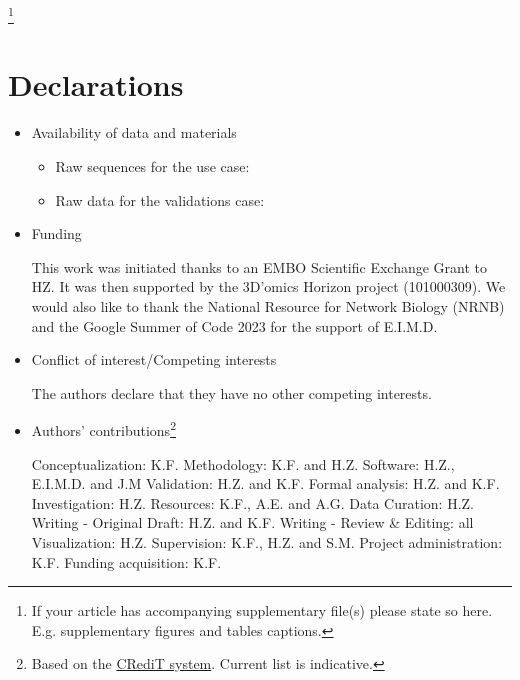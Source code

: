 \documentclass[sn-mathphys,Numbered]{sn-jnl}%
\theoremstyle{thmstyleone}%
\theoremstyle{thmstyletwo}%
\theoremstyle{thmstylethree}%
\begin{document}
    \label{supplementary-files}
    \footnote{
        If your article has accompanying supplementary file(s) please state so here.
        E.g. supplementary figures and tables captions. 
    }





\section*{Declarations}


    \begin{itemize}

        \item Availability of data and materials

        \begin{itemize}
            \item Raw sequences for the use case: 
            \item Raw data for the validations case:
        \end{itemize}


        \item Funding
        
            This work was initiated thanks to an EMBO Scientific Exchange Grant to HZ. 
            It was then supported by the 3D’omics Horizon project (101000309). 
            We would also like to thank the National Resource for Network Biology (NRNB) and the Google Summer of Code 2023 for the support of E.I.M.D.

        \item Conflict of interest/Competing interests 

            The authors declare that they have no other competing interests.

        \item Authors' contributions\footnote{Based on the \href{https://www-elsevier-com.kuleuven.e-bronnen.be/researcher/author/policies-and-guidelines/credit-author-statement}{CRediT system}. Current list is indicative.}

            Conceptualization: K.F.
            Methodology: K.F. and H.Z.
            Software: H.Z., E.I.M.D. and J.M
            Validation: H.Z. and K.F.
            Formal analysis: H.Z. and K.F.
            Investigation: H.Z.
            Resources: K.F., A.E. and A.G.
            Data Curation: H.Z.
            Writing - Original Draft: H.Z. and K.F. 
            Writing - Review \& Editing: all
            Visualization: H.Z.
            Supervision: K.F., H.Z. and S.M.
            Project administration: K.F.
            Funding acquisition: K.F.




\end{itemize}
\end{document}
